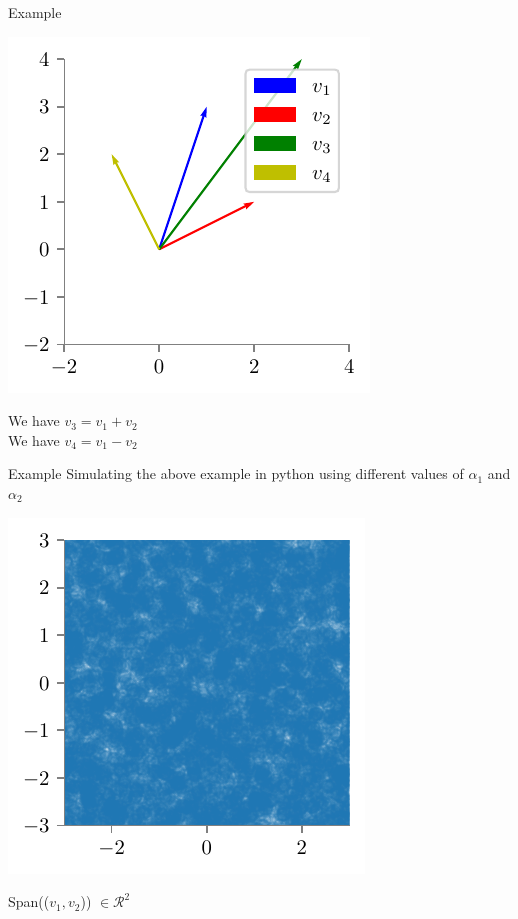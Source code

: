 \documentclass{beamer}
\begin{document}
\begin{frame}{Example}

    \includegraphics{../assets/linear-regression/figures/geoemetric-span-2.pdf}

    We have $v_3 = v_1 + v_2$ \\
    We have $v_4 = v_1 - v_2$ \\


\end{frame}

\begin{frame}{Example}
    Simulating the above example in python using different values of $\alpha_1$ and $\alpha_2$


    \includegraphics{../assets/linear-regression/figures/geoemetric-span-3.pdf}
    
    Span(($v_1, v_2$)) $\in \mathcal{R}^2$
\end{frame}
\end{document}
